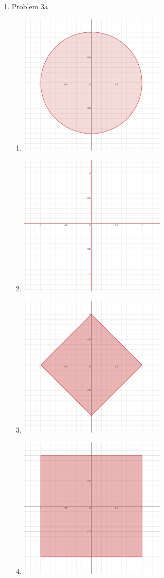 \documentclass[11pt]{article}
\begin{document}
\begin{enumerate}
      \item Problem 3a
            \begin{enumerate}
                  \item \includegraphics[width=7cm]{img/hw0/l2}
                  \item \includegraphics[width=7cm]{img/hw0/l0}
                  \item \includegraphics[width=7cm]{img/hw0/l1}
                  \item \includegraphics[width=7cm]{img/hw0/l_inf}
            \end{enumerate}


\end{enumerate}
\end{document}
